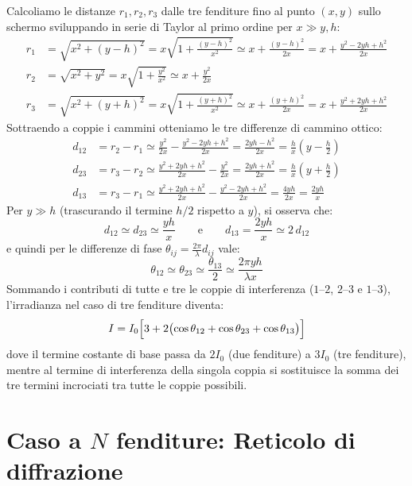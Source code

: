 \documentclass[openany,a4paper,12pt]{book}
\begin{document}
Calcoliamo le distanze $r_1, r_2, r_3$ dalle tre fenditure fino al punto $(x, y)$ sullo schermo sviluppando in serie di Taylor al primo ordine per $x \gg y, h$:
\begin{align*}
    r_1 &= \sqrt{x^2 + (y - h)^2} = x \sqrt{1 + \frac{(y - h)^2}{x^2}} \simeq x + \frac{(y - h)^2}{2x} = x + \frac{y^2 - 2yh + h^2}{2x} \\
    r_2 &= \sqrt{x^2 + y^2} = x \sqrt{1 + \frac{y^2}{x^2}} \simeq x + \frac{y^2}{2x} \\
    r_3 &= \sqrt{x^2 + (y + h)^2} = x \sqrt{1 + \frac{(y + h)^2}{x^2}} \simeq x + \frac{(y + h)^2}{2x} = x + \frac{y^2 + 2yh + h^2}{2x}
\end{align*}
Sottraendo a coppie i cammini otteniamo le tre differenze di cammino ottico:
\begin{align*}
    d_{12} &= r_2 - r_1 \simeq \frac{y^2}{2x} - \frac{y^2 - 2yh + h^2}{2x} = \frac{2yh - h^2}{2x} = \frac{h}{x}\left(y - \frac{h}{2}\right) \\
    d_{23} &= r_3 - r_2 \simeq \frac{y^2 + 2yh + h^2}{2x} - \frac{y^2}{2x} = \frac{2yh + h^2}{2x} = \frac{h}{x}\left(y + \frac{h}{2}\right) \\
    d_{13} &= r_3 - r_1 \simeq \frac{y^2 + 2yh + h^2}{2x} - \frac{y^2 - 2yh + h^2}{2x} = \frac{4yh}{2x} = \frac{2yh}{x}
\end{align*}
Per $y \gg h$ (trascurando il termine $h/2$ rispetto a $y$), si osserva che:
\[
    d_{12} \simeq d_{23} \simeq \frac{y h}{x} \qquad \text{e} \qquad d_{13} = \frac{2 y h}{x} \simeq 2\,d_{12}
\]
e quindi per le differenze di fase $\theta_{ij} = \frac{2\pi}{\lambda} d_{ij}$ vale:
\[
    \theta_{12} \simeq \theta_{23} \simeq \frac{\theta_{13}}{2} \simeq \frac{2\pi y h}{\lambda x}
\]
Sommando i contributi di tutte e tre le coppie di interferenza ($1$--$2$, $2$--$3$ e $1$--$3$), l'irradianza nel caso di tre fenditure diventa:
\[
    I = I_0 \Bigl[3 + 2\bigl(\cos\theta_{12} + \cos\theta_{23} + \cos\theta_{13}\bigr)\Bigr]
\]
dove il termine costante di base passa da $2I_0$ (due fenditure) a $3I_0$ (tre fenditure), mentre al termine di interferenza della singola coppia si sostituisce la somma dei tre termini incrociati tra tutte le coppie possibili.








\section{Caso a $N$ fenditure: Reticolo di diffrazione}
\end{document}
